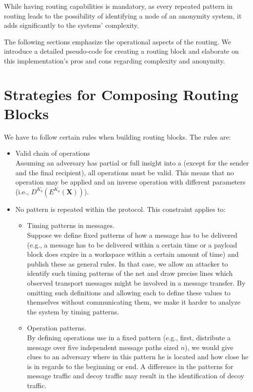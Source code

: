While having routing capabilities is mandatory, as every repeated pattern in routing leads to the possibility of identifying a node of an anonymity system, it adds significantly to the systems' complexity.

The following sections emphasize the operational aspects of the routing. We introduce a detailed pseudo-code for creating a routing block and elaborate on this implementation's pros and cons regarding complexity and anonymity.

\section{Strategies for Composing Routing Blocks}\label{sec:routingStrategies}
We have to follow certain rules when building routing blocks. The rules are:
\begin{itemize}
	\item Valid chain of operations\\
	Assuming an adversary has partial or full insight into a  (except for the sender and the final recipient), all operations must be valid. This means that no operation may be applied and an inverse operation with different parameters  (i.e., $D^{K_b}\left(E^{K_a}\left(\textbf{X}\right)\right)$).
	\item No pattern is repeated within the protocol. This constraint applies to:
	\begin{itemize}
		\item Timing patterns in messages.\\
		Suppose we define fixed patterns of how a message has to be delivered (e.g., a message has to be delivered within a certain time or a payload block does expire in a workspace within a certain amount of time) and publish these as general rules. In that case, we allow an attacker to identify such timing patterns of the net and draw precise lines which observed transport messages might be involved in a message transfer. By omitting such definitions and allowing each  to define these values to themselves without communicating them, we make it harder to analyze the system by timing patterns.
		\item Operation patterns.\\
		By defining operations use in a fixed pattern (e.g., first, distribute a message over five independent message paths sized $n$), we would give clues to an adversary where in this pattern he is located and how close he is in regards to the beginning or end. A difference in the patterns for message traffic and decoy traffic may result in the identification of decoy traffic.

\end{itemize}
\end{itemize}
